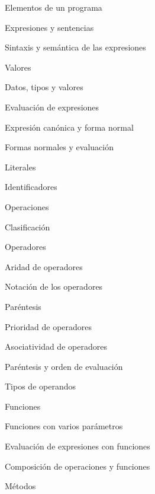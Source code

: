 \begin{longenum}
\begin{longenum}
        \item Elementos de un programa
        \begin{longenum}
            \item Expresiones y sentencias
            \item Sintaxis y semántica de las expresiones
        \end{longenum}
        \item Valores
        \begin{longenum}
            \item Datos, tipos y valores
            \item Evaluación de expresiones
            \item Expresión canónica y forma normal
            \item Formas normales y evaluación
            \item Literales
            \item Identificadores
        \end{longenum}
        \item Operaciones
        \begin{longenum}
            \item Clasificación
            \item Operadores
            \begin{longenum}
                \item Aridad de operadores
                \item Notación de los operadores
                \item Paréntesis
                \item Prioridad de operadores
                \item Asociatividad de operadores
                \item Paréntesis y orden de evaluación
                \item Tipos de operandos
            \end{longenum}
            \item Funciones
            \begin{longenum}
                \item Funciones con varios parámetros
                \item Evaluación de expresiones con funciones
                \item Composición de operaciones y funciones
            \end{longenum}
            \item Métodos

\end{longenum}
\end{longenum}
\end{longenum}
